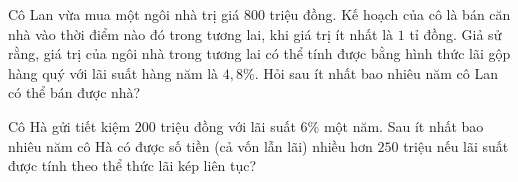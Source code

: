 \begin{bt}%
	Cô Lan vừa mua một ngôi nhà trị giá $800$ triệu đồng. Kế hoạch của cô là bán căn nhà vào thời điểm nào đó trong tương lai, khi giá trị ít nhất là $1$ tỉ đồng. Giả sử rằng, giá trị của ngôi nhà trong tương lai có thể tính được bằng hình thức lãi gộp hàng quý với lãi suất hàng năm là $4{,}8\%$. Hỏi sau ít nhất bao nhiêu năm cô Lan có thể bán được nhà?
\end{bt}

\begin{bt}%

	Cô Hà gửi tiết kiệm $200$ triệu đồng với lãi suất $6\%$ một năm. Sau ít nhất bao nhiêu năm cô Hà có được số tiền (cả vốn lẫn lãi) nhiều hơn $250$ triệu nếu lãi suất được tính theo thể thức lãi kép liên tục?
	
\end{bt}

